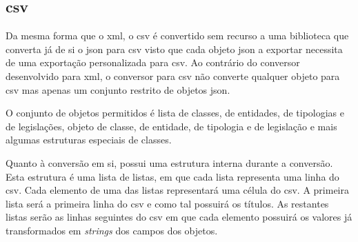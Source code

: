 \subsection{\acrshort{csv}}

Da mesma forma que o \acrshort{xml}, o \acrshort{csv} é convertido sem recurso a uma biblioteca que converta já de si o \acrshort{json} para \acrshort{csv} visto que cada objeto \acrshort{json} a exportar necessita de uma exportação personalizada para \acrshort{csv}. Ao contrário do conversor desenvolvido para \acrshort{xml}, o conversor para \acrshort{csv} não converte qualquer objeto para \acrshort{csv} mas apenas um conjunto restrito de objetos \acrshort{json}.

O conjunto de objetos permitidos é lista de classes, de entidades, de tipologias e de legislações, objeto de classe, de entidade, de tipologia e de legislação e mais algumas estruturas especiais de classes.

Quanto à conversão em si, possui uma estrutura interna durante a conversão. Esta estrutura é uma lista de listas, em que cada lista representa uma linha do \acrshort{csv}. Cada elemento de uma das listas representará uma célula do \acrshort{csv}. A primeira lista será a primeira linha do \acrshort{csv} e como tal possuirá os títulos. As restantes listas serão as linhas seguintes do \acrshort{csv} em que cada elemento possuirá os valores já transformados em \textit{strings} dos campos dos objetos.

